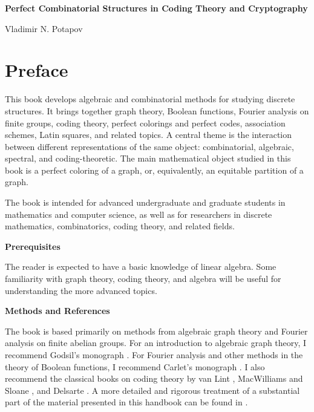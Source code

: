 \documentclass[11pt]{article}
\theoremstyle{definition}
\begin{document}
\begin{center}

\Large

{\bf \huge Perfect Combinatorial Structures in Coding Theory and Cryptography}

\bigskip

Vladimir N. Potapov
\end{center}

\pagebreak

\tableofcontents






\pagebreak

\section*{Preface}


This book develops algebraic and combinatorial methods for studying
discrete structures. It brings together graph theory, Boolean functions,
Fourier analysis on finite groups, coding theory, perfect colorings and
perfect codes, association schemes, Latin squares, and related topics.
A central theme is the interaction between different representations of
the same object: combinatorial, algebraic, spectral, and
coding-theoretic. The main mathematical object studied in this book is
a perfect coloring of a graph, or, equivalently, an equitable partition
of a graph.

The book is intended for advanced undergraduate and graduate students
in mathematics and computer science, as well as for researchers in
discrete mathematics, combinatorics, coding theory, and related fields.

\smallskip

{\bf Prerequisites}

The reader is expected to have a basic knowledge of linear algebra.
Some familiarity with graph theory, coding theory, and algebra will be
useful for understanding the more advanced topics.

\smallskip

{\bf Methods and References}

The book is based primarily on methods from algebraic graph theory and
Fourier analysis on finite abelian groups. For an introduction to
algebraic graph theory, I recommend Godsil's monograph \cite{Godsil}.
For Fourier analysis and other methods in the theory of Boolean
functions, I recommend Carlet's monograph \cite{Carlet20}. I also
recommend the classical books on coding theory by van Lint \cite{Lint},
MacWilliams and Sloane \cite{MacW}, and Delsarte \cite{Delsarte73}.
A more detailed and rigorous treatment of a substantial part of the
material presented in this handbook can be found in \cite{CRCKP}.
\end{document}
